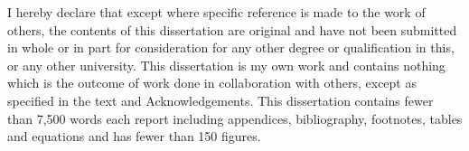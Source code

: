 
\begin{declaration}

I hereby declare that except where specific reference is made to the work of 
others, the contents of this dissertation are original and have not been 
submitted in whole or in part for consideration for any other degree or 
qualification in this, or any other university. This dissertation is my own 
work and contains nothing which is the outcome of work done in collaboration 
with others, except as specified in the text and Acknowledgements. This 
dissertation contains fewer than 7,500 words each report including appendices, 
bibliography, footnotes, tables and equations and has fewer than 150 figures.


\end{declaration}

